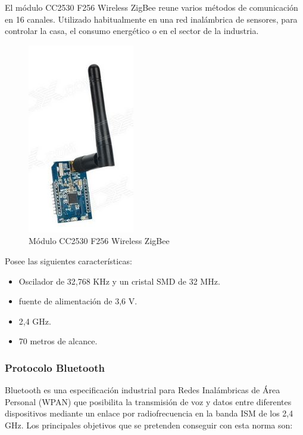 				El módulo CC2530 F256 Wireless ZigBee \cite{zigbee} reune varios métodos de comunicación en 16 canales. Utilizado habitualmente en una red inalámbrica de sensores, para controlar la casa, el consumo energético o en el sector de la industria.
				
				\begin{figure}[h]
					\centering
					\includegraphics{imagenes/zigbee.JPG}
					\caption{Módulo CC2530 F256 Wireless ZigBee}
					\label{contexto:figura}
				\end{figure}
				
				Posee las siguientes características:
				
				\begin{itemize}
					\item Oscilador de 32,768 KHz y un cristal SMD de 32 MHz.
					\item fuente de alimentación de 3,6 V.
					\item 2,4 GHz.
					\item 70 metros de alcance.
				\end{itemize}
				
			
				
				
			\subsubsection{Protocolo Bluetooth}
			
				Bluetooth es una especificación industrial para Redes Inalámbricas de Área Personal (WPAN) que posibilita la transmisión de voz y datos entre diferentes dispositivos mediante un enlace por radiofrecuencia en la banda ISM de los 2,4 GHz. Los principales objetivos que se pretenden conseguir con esta norma son:
				
